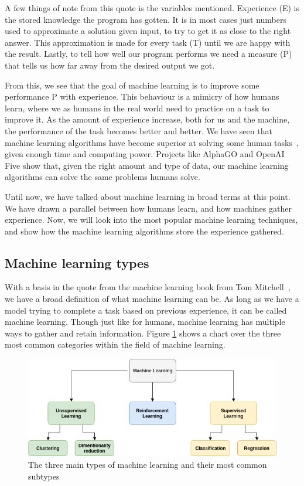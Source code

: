\vspace{10px}
A few things of note from this quote is the variables mentioned. Experience (E) is the stored knowledge the program has gotten. It is in most cases just numbers used to approximate a solution given input, to try to get it as close to the right answer. This approximation is made for every task (T) until we are happy with the result.
Lastly, to tell how well our program performs we need a measure (P) that tells us how far away from the desired output we got.
   
From this, we see that the goal of machine learning is to improve some performance P with experience. This behaviour is a mimicry of how humans learn, where we as humans in the real world need to practice on a task to improve it.
As the amount of experience increase, both for us and the machine, the performance of the task becomes better and better. We have seen that machine learning algorithms have become superior at solving some human tasks~\cite{silver2016mastering,OpenAI_dota,DBLP:journals/corr/HeZRS15}, given enough time and computing power. 
Projects like AlphaGO and OpenAI Five show that, given the right amount and type of data, our machine learning algorithms can solve the same problems humans solve.

Until now, we have talked about machine learning in broad terms at this point. We have drawn a parallel between how humans learn, and how machines gather experience.  Now, we will look into the most popular machine learning techniques, and show how the machine learning algorithms store the experience gathered.
 
\subsection{Machine learning types}
With a basis in the quote from the machine learning book from Tom Mitchell~\cite{MitchellTomM1997Ml}, we have a broad definition of what machine learning can be.
As long as we have a model trying to complete a task based on previous experience, it can be called machine learning. Though just like for humans, machine learning has multiple ways to gather and retain information.
Figure \ref{fig:ML_types} shows a chart over the three most common categories within the field of machine learning. 

    \begin{figure}[h]
        \centering
        \includegraphics[width=\textwidth]{background/figures/ML_types.png}
        \caption{The three main types of machine learning and their most common subtypes}
    \label{fig:ML_types} 
    \end{figure}

